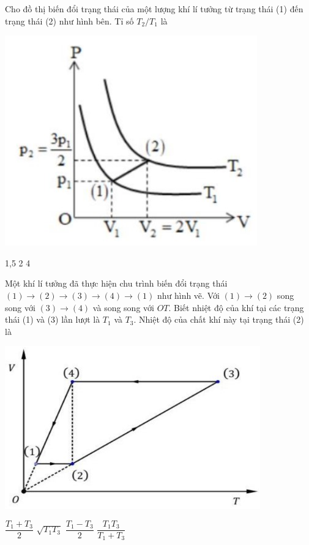 \begin{ex}
	Cho đồ thị biến đổi trạng thái của một lượng khí lí tưởng từ trạng thái (1) đến trạng thái (2) như hình bên. Tỉ số $T_2/T_1$ là 
	\begin{center}
		\includegraphics[width=0.35\linewidth]{figs/VN12-Y24-PH-SYL-014P-2}
	\end{center}
	
	\choice
	{1,5}
	{2}
	{}
	{4}
\end{ex}
\begin{ex}
	Một khí lí tưởng đã thực hiện chu trình biến đổi trạng thái $(1)\rightarrow (2)\rightarrow(3)\rightarrow(4)\rightarrow(1)$ như hình vẽ. Với $(1)\rightarrow(2)$ song song với $(3)\rightarrow(4)$ và song song với $OT$. Biết nhiệt độ của khí tại các trạng thái (1) và (3) lần lượt là $T_1$ và $T_3$. Nhiệt độ của chất khí này tại trạng thái (2) là
	\begin{center}
		\includegraphics[width=0.45\linewidth]{figs/VN12-Y24-PH-SYL-014P-4}
	\end{center}
	
	\choice
	{$\dfrac{T_1+T_3}{2}$}
	{\True $\sqrt{T_1T_3}$}
	{$\dfrac{T_1-T_3}{2}$}
	{$\dfrac{T_1T_3}{T_1+T_3}$}
\end{ex}
